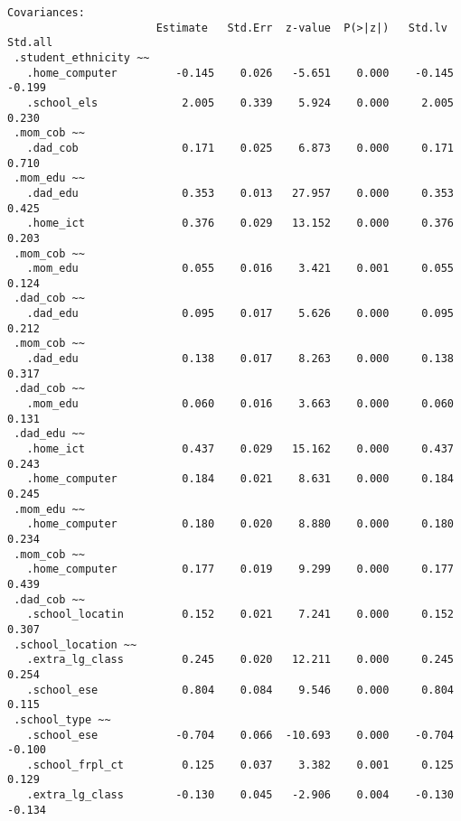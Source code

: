 \documentclass[
]{article}
\begin{document}
\begin{verbatim}
Covariances:
                       Estimate   Std.Err  z-value  P(>|z|)   Std.lv   Std.all
 .student_ethnicity ~~                                                        
   .home_computer         -0.145    0.026   -5.651    0.000    -0.145   -0.199
   .school_els             2.005    0.339    5.924    0.000     2.005    0.230
 .mom_cob ~~                                                                  
   .dad_cob                0.171    0.025    6.873    0.000     0.171    0.710
 .mom_edu ~~                                                                  
   .dad_edu                0.353    0.013   27.957    0.000     0.353    0.425
   .home_ict               0.376    0.029   13.152    0.000     0.376    0.203
 .mom_cob ~~                                                                  
   .mom_edu                0.055    0.016    3.421    0.001     0.055    0.124
 .dad_cob ~~                                                                  
   .dad_edu                0.095    0.017    5.626    0.000     0.095    0.212
 .mom_cob ~~                                                                  
   .dad_edu                0.138    0.017    8.263    0.000     0.138    0.317
 .dad_cob ~~                                                                  
   .mom_edu                0.060    0.016    3.663    0.000     0.060    0.131
 .dad_edu ~~                                                                  
   .home_ict               0.437    0.029   15.162    0.000     0.437    0.243
   .home_computer          0.184    0.021    8.631    0.000     0.184    0.245
 .mom_edu ~~                                                                  
   .home_computer          0.180    0.020    8.880    0.000     0.180    0.234
 .mom_cob ~~                                                                  
   .home_computer          0.177    0.019    9.299    0.000     0.177    0.439
 .dad_cob ~~                                                                  
   .school_locatin         0.152    0.021    7.241    0.000     0.152    0.307
 .school_location ~~                                                          
   .extra_lg_class         0.245    0.020   12.211    0.000     0.245    0.254
   .school_ese             0.804    0.084    9.546    0.000     0.804    0.115
 .school_type ~~                                                              
   .school_ese            -0.704    0.066  -10.693    0.000    -0.704   -0.100
   .school_frpl_ct         0.125    0.037    3.382    0.001     0.125    0.129
   .extra_lg_class        -0.130    0.045   -2.906    0.004    -0.130   -0.134

\end{verbatim}
\end{document}
